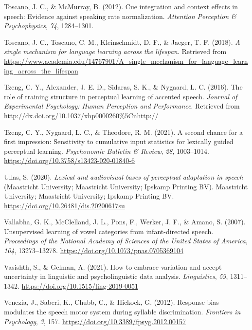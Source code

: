 \documentclass[
  11pt,
  english,
  man,floatsintext]{apa6}
\newlength{\cslhangindent}
\newlength{\cslentryspacingunit} %
\newenvironment{CSLReferences}[2] %
 {%
  \setlength{\parindent}{0pt}
  \ifodd #1
  \let\oldpar\par
  \def\par{\hangindent=\cslhangindent\oldpar}
  \fi
  \setlength{\parskip}{#2\cslentryspacingunit}
 }%
 {}
\begin{document}
\begin{CSLReferences}{1}{0}
\leavevmode{}%
Toscano, J. C., \& McMurray, B. (2012). Cue integration and context effects in speech: Evidence against speaking rate normalization. \emph{Attention Perception \& Psychophysics}, \emph{74}, 1284--1301.

\leavevmode{}%
Toscano, J. C., Toscano, C. M., Kleinschmidt, D. F., \& Jaeger, T. F. (2018). \emph{A single mechanism for language learning across the lifespan}. Retrieved from \url{https://www.academia.edu/14767901/A_single_mechanism_for_language_learning_across_the_lifespan}

\leavevmode{}%
Tzeng, C. Y., Alexander, J. E. D., Sidaras, S. K., \& Nygaard, L. C. (2016). The role of training structure in perceptual learning of accented speech. \emph{Journal of Experimental Psychology: Human Perception and Performance}. Retrieved from \url{http://dx.doi.org/10.1037/xhp0000260\%5Cnhttp://}

\leavevmode{}%
Tzeng, C. Y., Nygaard, L. C., \& Theodore, R. M. (2021). A second chance for a first impression: Sensitivity to cumulative input statistics for lexically guided perceptual learning. \emph{Psychonomic Bulletin \& Review}, \emph{28}, 1003--1014. \url{https://doi.org/10.3758/s13423-020-01840-6}

\leavevmode{}%
Ullas, S. (2020). \emph{Lexical and audiovisual bases of perceptual adaptation in speech} (Maastricht University; Maastricht University; Ipskamp Printing BV). Maastricht University; Maastricht University; Ipskamp Printing BV. \url{https://doi.org/10.26481/dis.20200617su}

\leavevmode{}%
Vallabha, G. K., McClelland, J. L., Pons, F., Werker, J. F., \& Amano, S. (2007). Unsupervised learning of vowel categories from infant-directed speech. \emph{Proceedings of the National Academy of Sciences of the United States of America}, \emph{104}, 13273--13278. \url{https://doi.org/10.1073/pnas.0705369104}

\leavevmode{}%
Vasishth, S., \& Gelman, A. (2021). How to embrace variation and accept uncertainty in linguistic and psycholinguistic data analysis. \emph{Linguistics}, \emph{59}, 1311--1342. \url{https://doi.org/10.1515/ling-2019-0051}

\leavevmode{}%
Venezia, J., Saberi, K., Chubb, C., \& Hickock, G. (2012). Response bias modulates the speech motor system during syllable discrimination. \emph{Frontiers in Psychology}, \emph{3}, 157. \url{https://doi.org/10.3389/fpsyg.2012.00157}


\end{CSLReferences}
\end{document}
